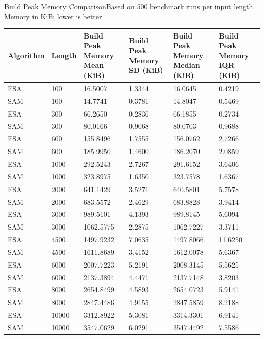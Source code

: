 \begin{benchmarktable}{Build Peak Memory Comparison}{Based on 500 benchmark runs per input length. Memory in KiB; lower is better.}
\begin{tabularx}{\textwidth}{|X|X|X|X|X|X|}
\toprule
Algorithm & Length & Build Peak Memory Mean (KiB) & Build Peak Memory SD (KiB) & Build Peak Memory Median (KiB) & Build Peak Memory IQR (KiB) \\
\midrule
ESA & 100 & 16.5007 & 1.3344 & 16.0645 & 0.4219 \\
SAM & 100 & 14.7741 & 0.3781 & 14.8047 & 0.5469 \\
\hline
ESA & 300 & 66.2650 & 0.2836 & 66.1855 & 0.2734 \\
SAM & 300 & 80.0166 & 0.9068 & 80.0703 & 0.9688 \\
\hline
ESA & 600 & 155.8496 & 1.7555 & 156.0762 & 2.7266 \\
SAM & 600 & 185.9950 & 1.4600 & 186.2070 & 2.0859 \\
\hline
ESA & 1000 & 292.5243 & 2.7267 & 291.6152 & 3.6406 \\
SAM & 1000 & 323.8975 & 1.6350 & 323.7578 & 1.6367 \\
\hline
ESA & 2000 & 641.1429 & 3.5271 & 640.5801 & 5.7578 \\
SAM & 2000 & 683.5572 & 2.4629 & 683.8828 & 3.9414 \\
\hline
ESA & 3000 & 989.5101 & 4.1393 & 989.8145 & 5.6094 \\
SAM & 3000 & 1062.5775 & 2.2875 & 1062.7227 & 3.3711 \\
\hline
ESA & 4500 & 1497.9232 & 7.0635 & 1497.8066 & 11.6250 \\
SAM & 4500 & 1611.8689 & 3.4152 & 1612.0078 & 5.6367 \\
\hline
ESA & 6000 & 2007.7223 & 5.2191 & 2008.3145 & 5.5625 \\
SAM & 6000 & 2137.3894 & 4.4471 & 2137.7148 & 3.8203 \\
\hline
ESA & 8000 & 2654.8499 & 4.5893 & 2654.0723 & 5.9141 \\
SAM & 8000 & 2847.4486 & 4.9155 & 2847.5859 & 8.2188 \\
\hline
ESA & 10000 & 3312.8922 & 5.3081 & 3314.3301 & 6.9141 \\
SAM & 10000 & 3547.0629 & 6.0291 & 3547.4492 & 7.5586 \\
\bottomrule
\end{tabularx}
\end{benchmarktable}

